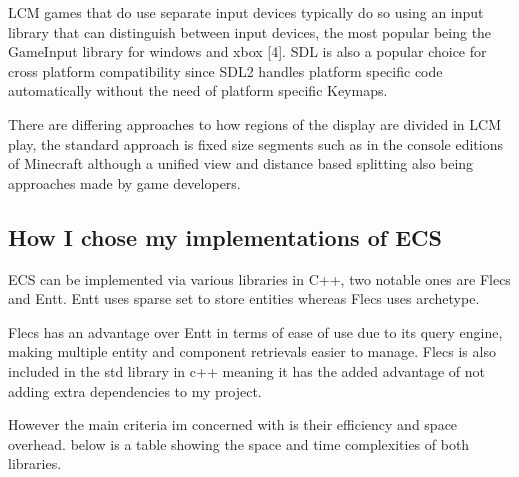 \documentclass[]{final_report}
\begin{document}
LCM games that do use separate input devices typically do so using an input library that can distinguish between input devices, the most popular being the GameInput library for windows and xbox [4]. SDL is also a popular choice for cross platform compatibility since SDL2 handles platform specific code automatically without the need of platform specific Keymaps. \newline

There are differing approaches to how regions of the display are divided in LCM play, the standard approach is fixed size segments such as in the console editions of Minecraft although a unified view and distance based splitting also being approaches made by game developers. \newline


\subsection{How I chose my implementations of ECS}
ECS can be implemented via various libraries in C++, two notable ones are Flecs and Entt. Entt uses sparse set to store entities whereas Flecs uses archetype.

Flecs has an advantage over Entt in terms of ease of use due to its query engine, making multiple entity and component retrievals easier to manage. Flecs is also included in the std library in c++ meaning it has the added advantage of not adding extra dependencies to my project.

However the main criteria im concerned with is their efficiency and space overhead. below is a table showing the space and time complexities of both libraries.
\end{document}
